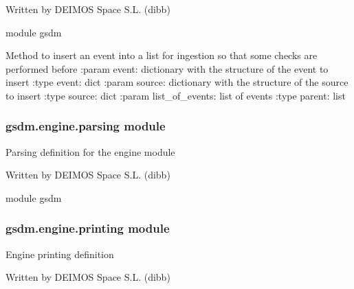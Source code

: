 Written by DEIMOS Space S.L. (dibb)

module gsdm

\begin{fulllineitems}
\label{\detokenize{gsdm.engine:gsdm.engine.ingestion.insert_event_for_ingestion}}
Method to insert an event into a list for ingestion so that some checks are performed before
:param event: dictionary with the structure of the event to insert
:type event: dict
:param source: dictionary with the structure of the source to insert
:type source: dict
:param list\_of\_events: list of events
:type parent: list

\end{fulllineitems}



\subsubsection{gsdm.engine.parsing module}
\label{\detokenize{gsdm.engine:module-gsdm.engine.parsing}}\label{\detokenize{gsdm.engine:gsdm-engine-parsing-module}}
Parsing definition for the engine module

Written by DEIMOS Space S.L. (dibb)

module gsdm

\begin{fulllineitems}
\label{\detokenize{gsdm.engine:gsdm.engine.parsing.validate_data_dictionary}}
\end{fulllineitems}



\subsubsection{gsdm.engine.printing module}
\label{\detokenize{gsdm.engine:module-gsdm.engine.printing}}\label{\detokenize{gsdm.engine:gsdm-engine-printing-module}}
Engine printing definition

Written by DEIMOS Space S.L. (dibb)

